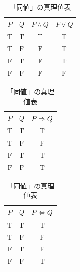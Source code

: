 \begin{table}[htbp]
\begin{minipage}[t]{0.32\linewidth}
\centering
\caption{論理和（積）の真理値表}
\label{tab:論理和（積）の真理値表}
\begin{tabular}{|c|c|c|c|} \hline
  $P$          & $Q$          & $P \land Q$  & $P \lor Q$   \\ \hline
  $\mathrm{T}$ & $\mathrm{T}$ & $\mathrm{T}$ & $\mathrm{T}$ \\ \hline
  $\mathrm{T}$ & $\mathrm{F}$ & $\mathrm{F}$ & $\mathrm{T}$ \\ \hline
  $\mathrm{F}$ & $\mathrm{T}$ & $\mathrm{F}$ & $\mathrm{T}$ \\ \hline
  $\mathrm{F}$ & $\mathrm{F}$ & $\mathrm{F}$ & $\mathrm{F}$ \\ \hline
\end{tabular}
\end{minipage}
\hfill
\begin{minipage}[t]{0.32\linewidth}
\centering
\caption{「含意」の真理値表}
\label{tab:含意の真理値表}
\begin{tabular}{|c|c|c|} \hline
  $P$          & $Q$          & $P \mathrel{\Rightarrow} Q$  \\ \hline
  $\mathrm{T}$ & $\mathrm{T}$ & $\mathrm{T}$ \\ \hline
  $\mathrm{T}$ & $\mathrm{F}$ & $\mathrm{F}$ \\ \hline
  $\mathrm{F}$ & $\mathrm{T}$ & $\mathrm{T}$ \\ \hline
  $\mathrm{F}$ & $\mathrm{F}$ & $\mathrm{T}$ \\ \hline
\end{tabular}
\end{minipage}
\hfill
\begin{minipage}[t]{0.32\linewidth}
\centering
\caption{「同値」の真理値表}
\label{tab:同値の真理値表}
\begin{tabular}{|c|c|c|} \hline
  $P$          & $Q$          & $P \mathrel{\Leftrightarrow} Q$ \\ \hline
  $\mathrm{T}$ & $\mathrm{T}$ & $\mathrm{T}$          \\ \hline
  $\mathrm{T}$ & $\mathrm{F}$ & $\mathrm{F}$          \\ \hline
  $\mathrm{F}$ & $\mathrm{T}$ & $\mathrm{F}$          \\ \hline
  $\mathrm{F}$ & $\mathrm{F}$ & $\mathrm{T}$          \\ \hline
\end{tabular}
\end{minipage}

\end{table}

